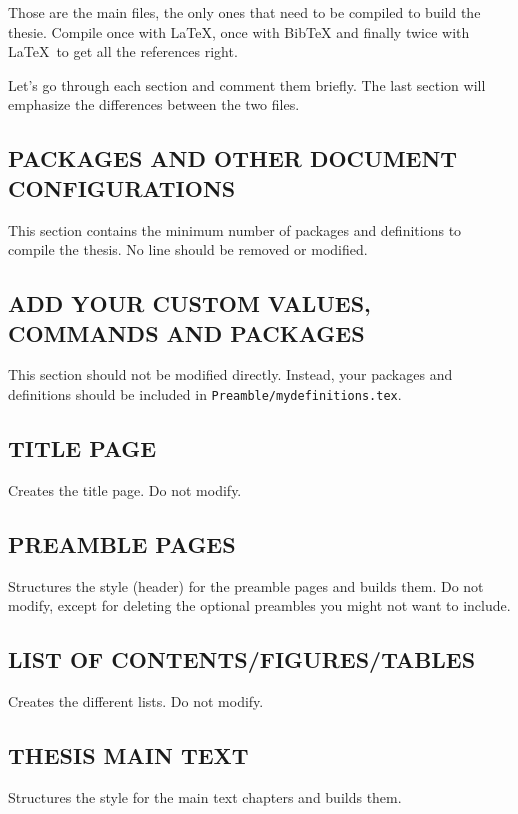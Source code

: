 Those are the main files, the only ones that need to be compiled to build the thesie. Compile once with \LaTeX, once with BibTeX and finally twice with \LaTeX\ to get all the references right.

Let's go through each section and comment them briefly. The last section will emphasize the differences between the two files.

\subsection{PACKAGES AND OTHER DOCUMENT CONFIGURATIONS}

This section contains the minimum number of packages and definitions to compile the thesis. No line should be removed or modified.

\subsection{ADD YOUR CUSTOM VALUES, COMMANDS AND PACKAGES}

This section should not be modified directly. Instead, your packages and definitions should be included in  \texttt{Preamble/mydefinitions.tex}.

\subsection{TITLE PAGE}

Creates the title page. Do not modify.

\subsection{PREAMBLE PAGES}

Structures the style (header) for the preamble pages and builds them. Do not modify, except for deleting the optional preambles you might not want to include.

\subsection{LIST OF CONTENTS/FIGURES/TABLES}

Creates the different lists. Do not modify.

\subsection{THESIS MAIN TEXT}

Structures the style for the main text chapters and builds them. 

